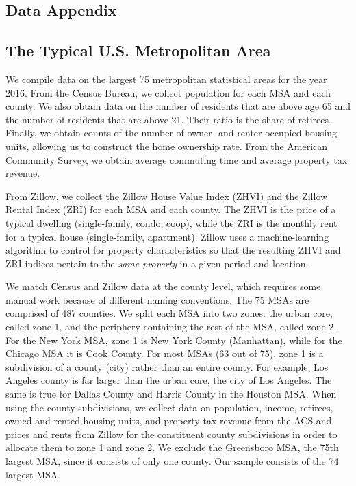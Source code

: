 \documentclass[letterpaper,12pt,dvipsnames,usenames]{article}
\theoremstyle{definition}
\begin{document}
\begin{spacing}{1.0}
\begin{small}
\section{Data Appendix} \label{app:data}

\subsection{The Typical U.S. Metropolitan Area}

We compile data on the largest 75 metropolitan statistical areas for the year 2016.  From the Census Bureau, we collect population for each MSA and each county. We also obtain data on the number of residents that are above age 65 and the number of residents that are above 21. Their ratio is the share of retirees. Finally, we obtain counts of the number of owner- and renter-occupied housing units, allowing us to construct the home ownership rate. From the American Community Survey, we obtain average commuting time and average property tax revenue.

From Zillow, we collect the Zillow House Value Index (ZHVI) and the Zillow Rental Index (ZRI) for each MSA and each county. The ZHVI is the price of a typical dwelling (single-family, condo, coop), while the ZRI is the monthly rent for a typical house (single-family, apartment). Zillow uses a machine-learning algorithm to control for property characteristics so that the resulting ZHVI and ZRI indices pertain to the \emph{same property} in a given period and location.

We match Census and Zillow data at the county level, which requires some manual work because of different naming conventions. The 75 MSAs are comprised of 487 counties. We split each MSA into two zones: the urban core, called zone 1, and the periphery containing the rest of the MSA, called zone 2. For the New York MSA, zone 1 is New York County (Manhattan), while for the Chicago MSA it is Cook County. For most MSAs (63 out of 75), zone 1 is a subdivision of a county (city) rather than an entire county. For example, Los Angeles county is far larger than the urban core, the city of Los Angeles. The same is true for Dallas County and Harris County in the Houston MSA. When using the county subdivisions, we collect data on population, income, retirees, owned and rented housing units, and property tax revenue from the ACS and prices and rents from Zillow for the constituent county subdivisions in order to allocate them to zone 1 and zone 2. We exclude the Greensboro MSA, the 75th largest MSA, since it consists of only one county. Our sample consists of the 74 largest MSA.


\end{small}
\end{spacing}
\end{document}
